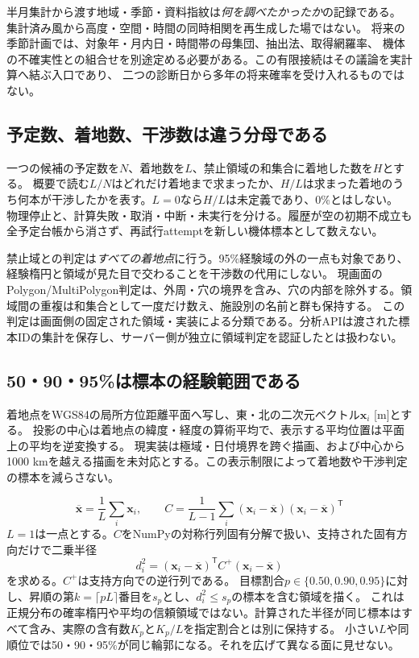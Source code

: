 \documentclass[11pt,a4paper]{article}
\begin{document}
半月集計から渡す地域・季節・資料指紋は\emph{何を調べたかったか}の記録である。
集計済み風から高度・空間・時間の同時相関を再生成した場ではない。
将来の季節計画では、対象年・月内日・時間帯の母集団、抽出法、取得網羅率、
機体の不確実性との組合せを別途定める必要がある。この有限接続はその議論を実計算へ結ぶ入口であり、
二つの診断日から多年の将来確率を受け入れるものではない。

\clearpage
\subsection{予定数、着地数、干渉数は違う分母である}
一つの候補の予定数を$N$、着地数を$L$、禁止領域の和集合に着地した数を$H$とする。
概要で読む$L/N$はどれだけ着地まで求まったか、$H/L$は求まった着地のうち何本が干渉したかを表す。$L=0$なら$H/L$は未定義であり、0\%とはしない。
物理停止と、計算失敗・取消・中断・未実行を分ける。履歴が空の初期不成立も全予定台帳から消さず、再試行attemptを新しい機体標本として数えない。

禁止域との判定は\emph{すべての着地点}に行う。95\%経験域の外の一点も対象であり、経験楕円と領域が見た目で交わることを干渉数の代用にしない。
現画面のPolygon/MultiPolygon判定は、外周・穴の境界を含み、穴の内部を除外する。領域間の重複は和集合として一度だけ数え、施設別の名前と群も保持する。
この判定は画面側の固定された領域・実装による分類である。分析APIは渡された標本IDの集計を保存し、サーバー側が独立に領域判定を認証したとは扱わない。

\subsection{50・90・95\%は標本の経験範囲である}
着地点をWGS84の局所方位距離平面へ写し、東・北の二次元ベクトル$\boldsymbol x_i$ [m]とする。
投影の中心は着地点の緯度・経度の算術平均で、表示する平均位置は平面上の平均を逆変換する。
現実装は極域・日付境界を跨ぐ描画、および中心から1000 kmを越える描画を未対応とする。この表示制限によって着地数や干渉判定の標本を減らさない。

\begin{equation}
 \overline{\boldsymbol x}=\frac1L\sum_i\boldsymbol x_i,\qquad
 C=\frac1{L-1}\sum_i(\boldsymbol x_i-\overline{\boldsymbol x})(\boldsymbol x_i-\overline{\boldsymbol x})^\mathsf T
\end{equation}
$L=1$は一点とする。$C$をNumPyの対称行列固有分解で扱い、支持された固有方向だけで二乗半径
\begin{equation}
 d_i^2=(\boldsymbol x_i-\overline{\boldsymbol x})^\mathsf T C^+
       (\boldsymbol x_i-\overline{\boldsymbol x})
\end{equation}
を求める。$C^+$は支持方向での逆行列である。
目標割合$p\in\{0.50,0.90,0.95\}$に対し、昇順の第$k=\lceil pL\rceil$番目を$s_p$とし、$d_i^2\le s_p$の標本を含む領域を描く。
これは正規分布の確率楕円や平均の信頼領域ではない。計算された半径が同じ標本はすべて含み、実際の含有数$K_p$と$K_p/L$を指定割合とは別に保持する。
小さい$L$や同順位では50・90・95\%が同じ輪郭になる。それを広げて異なる面に見せない。
\end{document}
